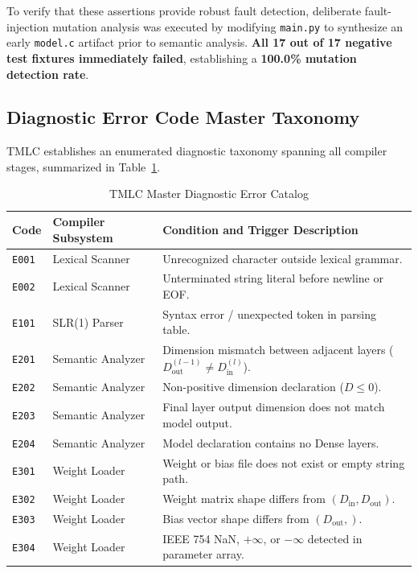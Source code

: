 \documentclass[11pt,a4paper]{article}
\begin{document}
To verify that these assertions provide robust fault detection, deliberate fault-injection mutation analysis was executed by modifying \texttt{main.py} to synthesize an early \texttt{model.c} artifact prior to semantic analysis. \textbf{All 17 out of 17 negative test fixtures immediately failed}, establishing a \textbf{100.0\% mutation detection rate}.

\subsection{Diagnostic Error Code Master Taxonomy}
TMLC establishes an enumerated diagnostic taxonomy spanning all compiler stages, summarized in Table~\ref{tab:error_taxonomy}.

\begin{table}[htbp]
\centering
\small
\caption{TMLC Master Diagnostic Error Catalog}
\label{tab:error_taxonomy}
\begin{tabular}{llp{9.2cm}}
\toprule
\textbf{Code} & \textbf{Compiler Subsystem} & \textbf{Condition and Trigger Description} \\
\midrule
\texttt{E001} & Lexical Scanner            & Unrecognized character outside lexical grammar. \\
\texttt{E002} & Lexical Scanner            & Unterminated string literal before newline or EOF. \\
\texttt{E101} & SLR(1) Parser              & Syntax error / unexpected token in parsing table. \\
\texttt{E201} & Semantic Analyzer          & Dimension mismatch between adjacent layers ($D_{\text{out}}^{(l-1)} \neq D_{\text{in}}^{(l)}$). \\
\texttt{E202} & Semantic Analyzer          & Non-positive dimension declaration ($D \le 0$). \\
\texttt{E203} & Semantic Analyzer          & Final layer output dimension does not match model output. \\
\texttt{E204} & Semantic Analyzer          & Model declaration contains no Dense layers. \\
\texttt{E301} & Weight Loader              & Weight or bias file does not exist or empty string path. \\
\texttt{E302} & Weight Loader              & Weight matrix shape differs from $(D_{\text{in}}, D_{\text{out}})$. \\
\texttt{E303} & Weight Loader              & Bias vector shape differs from $(D_{\text{out}},)$. \\
\texttt{E304} & Weight Loader              & IEEE 754 NaN, $+\infty$, or $-\infty$ detected in parameter array. \\

\end{tabular}
\end{table}
\end{document}
